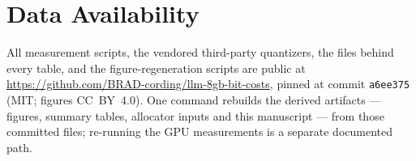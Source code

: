 \documentclass[10pt,journal]{IEEEtran}
\begin{document}
\section*{Data Availability}
All measurement scripts, the vendored third-party quantizers, the files behind
every table, and the figure-regeneration scripts are public at
\url{https://github.com/BRAD-cording/llm-8gb-bit-costs}, pinned at commit
\texttt{a6ee375} (MIT; figures CC~BY~4.0). One command rebuilds
the derived artifacts --- figures, summary
tables, allocator inputs and this manuscript --- from those committed files;
re-running the GPU measurements is a separate documented path.

\appendices


\end{document}
